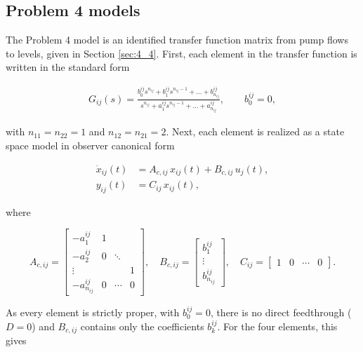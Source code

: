 \subsection{Problem 4 models}

The Problem 4 model is an identified transfer function matrix from pump flows to levels, given in Section \ref{sec:4_4}. First, each element in the transfer function is written in the standard form

\begin{align}
    G_{ij}(s) = \frac{b^{ij}_0 s^{n_{ij}} + b^{ij}_1 s^{n_{ij}-1} + \dots + b^{ij}_{n_{ij}}}
                     {s^{n_{ij}} + a^{ij}_1 s^{n_{ij}-1} + \dots + a^{ij}_{n_{ij}}},
    \qquad b^{ij}_0=0,
\end{align}

with $n_{11}=n_{22}=1$ and $n_{12}=n_{21}=2$. Next, each element is realized as a state space model in observer canonical form

\begin{align}
  \dot x_{ij}(t) &= A_{c,ij}\,x_{ij}(t)+B_{c,ij}\,u_j(t), \\
  y_{ij}(t) &= C_{ij}\,x_{ij}(t),
\end{align}

where

\begin{equation}
  A_{c,ij}=\begin{bmatrix}-a^{ij}_1&1&&\\-a^{ij}_2&0&\ddots&\\\vdots&&&1\\ -a^{ij}_{n_{ij}}&0&\cdots&0\end{bmatrix},\quad
  B_{c,ij}=\begin{bmatrix}b^{ij}_1\\\vdots\\b^{ij}_{n_{ij}}\end{bmatrix},\quad
  C_{ij}=\begin{bmatrix}1&0&\cdots&0\end{bmatrix}.
\end{equation}

As every element is strictly proper, with $b^{ij}_0=0$, there is no direct feedthrough ($D=0$) and $B_{c,ij}$ contains only the coefficients $b^{ij}_k$. For the four elements, this gives

